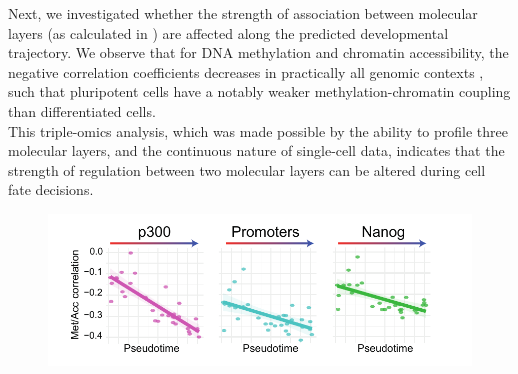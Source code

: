 

Next, we investigated whether the strength of association between molecular layers (as calculated in ) are affected along the predicted developmental trajectory. We observe that for DNA methylation and chromatin accessibility, the negative correlation coefficients decreases in practically all genomic contexts , such that pluripotent cells have a notably weaker methylation-chromatin coupling than differentiated cells.\\
This triple-omics analysis, which was made possible by the ability to profile three molecular layers, and the continuous nature of single-cell data, indicates that the strength of regulation between two molecular layers can be altered during cell fate decisions.

\begin{figure}[H]
	\centering
	\includegraphics[width=0.9\linewidth]{scNMT_pseudotime_coupling}
	\caption[]{}
	\label{fig:scnmt_pseudotime_coupling}
\end{figure}

